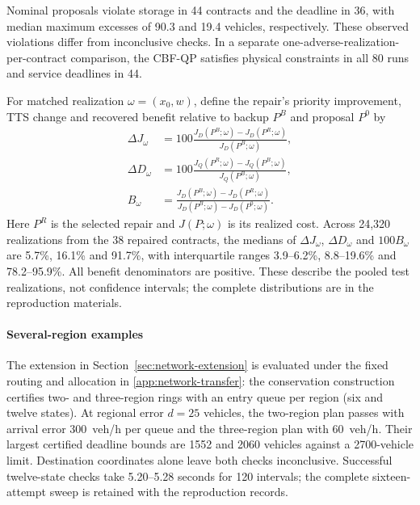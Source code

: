 \documentclass[preprint,12pt]{elsarticle}
\theoremstyle{definition}
\theoremstyle{plain}
\theoremstyle{definition}
\theoremstyle{plain}
\newcommand{\appref}[1]{\ref{#1}}
\begin{document}
Nominal proposals violate storage in 44 contracts and the deadline in
36, with median maximum excesses of 90.3 and 19.4 vehicles, respectively.
These observed violations differ from inconclusive checks. In a separate
one-adverse-realization-per-contract comparison, the CBF-QP satisfies
physical constraints in all 80 runs and service deadlines in 44.

For matched realization $\omega=(x_0,w)$, define the repair's priority
improvement, TTS change and recovered benefit relative to backup $P^B$
and proposal $P^0$ by
\begin{equation}
\begin{aligned}
\Delta J_\omega&=100\frac{J_D(P^B;\omega)-J_D(P^R;\omega)}{J_D(P^B;\omega)},\\
\Delta D_\omega&=100\frac{J_Q(P^R;\omega)-J_Q(P^B;\omega)}{J_Q(P^B;\omega)},\\
B_\omega&=\frac{J_D(P^B;\omega)-J_D(P^R;\omega)}{J_D(P^B;\omega)-J_D(P^0;\omega)}.
\end{aligned}
\label{eq:benchmark-repair-metrics}
\end{equation}
Here $P^R$ is the selected repair and $J(P;\omega)$ is its realized cost.
Across 24,320 realizations from the 38 repaired contracts, the medians
of $\Delta J_\omega$, $\Delta D_\omega$ and $100B_\omega$ are 5.7\%,
16.1\% and 91.7\%, with interquartile ranges 3.9--6.2\%, 8.8--19.6\%
and 78.2--95.9\%. All benefit denominators are positive. These describe
the pooled test realizations, not confidence intervals; the complete
distributions are in the reproduction materials.

\paragraph{Several-region examples}
\label{sec:network-transfer-results}
The extension in Section~\ref{sec:network-extension} is evaluated under
the fixed routing and allocation in \appref{app:network-transfer}:
the conservation construction certifies two- and three-region rings
with an entry queue per region (six and twelve states). At regional
error $d=25$ vehicles, the two-region plan passes with arrival error
300~veh/h per queue and the three-region plan with 60~veh/h. Their
largest certified deadline bounds are 1552 and 2060 vehicles against
a 2700-vehicle limit. Destination coordinates alone leave both checks
inconclusive. Successful twelve-state checks take 5.20--5.28 seconds
for 120 intervals; the complete sixteen-attempt sweep is retained with
the reproduction records.
\end{document}
